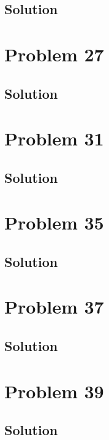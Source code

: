 \documentclass[12pt]{article}
\begin{document}
        \subsection{Solution}

    \pagebreak
    \section{Problem 27}

        \subsection{Solution}

    \pagebreak
    \section{Problem 31}

        \subsection{Solution}

    \pagebreak
    \section{Problem 35}

        \subsection{Solution}

    \pagebreak
    \section{Problem 37}

        \subsection{Solution}

    \pagebreak
    \section{Problem 39}

        \subsection{Solution}

    \pagebreak
\end{document}
